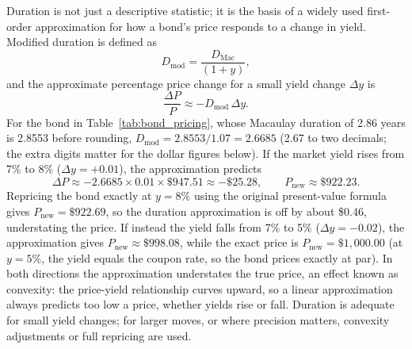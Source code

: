 \documentclass[../ai_in_finance]{subfiles}
\begin{document}
Duration is not just a descriptive statistic; it is the basis of a widely used first-order approximation for how a bond's
price responds to a change in yield. Modified duration is defined as
$$D_{\text{mod}} = \frac{D_{\text{Mac}}}{(1+y)},$$
and the approximate percentage price change for a small yield change $\Delta y$ is
\begin{equation}
\frac{\Delta P}{P} \approx -D_{\text{mod}} \, \Delta y.\label{eq:valuation-duration}
\end{equation}
For the bond in Table~\ref{tab:bond_pricing}, whose Macaulay duration of 2.86 years is 2.8553 before rounding, $D_{\text{mod}} = 2.8553 / 1.07 = 2.6685$ (2.67 to two decimals; the extra digits matter for the dollar figures below). If the market yield rises from 7\% to 8\% ($\Delta y = +0.01$), the approximation predicts
\begin{equation*}
\Delta P \approx -2.6685 \times 0.01 \times \$947.51 \approx -\$25.28, \qquad P_{\text{new}} \approx \$922.23.
\end{equation*}
Repricing the bond exactly at $y=8\%$ using the original present-value formula gives $P_{\text{new}} = \$922.69$, so the duration approximation is off by about \$0.46, understating the price. If instead the yield falls from 7\% to 5\% ($\Delta y = -0.02$), the approximation gives $P_{\text{new}} \approx \$998.08$, while the exact price is $P_{\text{new}} = \$1{,}000.00$ (at $y=5\%$, the yield equals the coupon rate, so the bond prices exactly at par). In both directions the approximation understates the true price, an effect known as convexity: the price-yield relationship curves upward, so a linear approximation always predicts too low a price, whether yields rise or fall. Duration is adequate for small yield changes; for larger moves, or where precision matters, convexity adjustments or full repricing are used.
\end{document}
